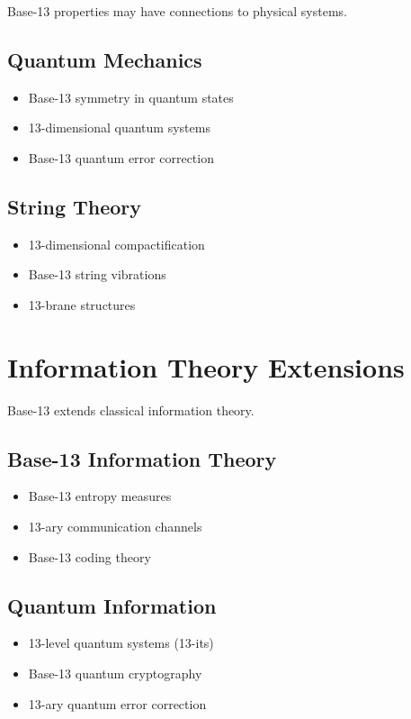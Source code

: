 \documentclass[12pt,a4paper]{report}
\begin{document}
Base-13 properties may have connections to physical systems.

\subsection{Quantum Mechanics}

\begin{itemize}
\item Base-13 symmetry in quantum states
\item 13-dimensional quantum systems
\item Base-13 quantum error correction
\end{itemize}

\subsection{String Theory}

\begin{itemize}
\item 13-dimensional compactification
\item Base-13 string vibrations
\item 13-brane structures
\end{itemize}

\section{Information Theory Extensions}

Base-13 extends classical information theory.

\subsection{Base-13 Information Theory}

\begin{itemize}
\item Base-13 entropy measures
\item 13-ary communication channels
\item Base-13 coding theory
\end{itemize}

\subsection{Quantum Information}

\begin{itemize}
\item 13-level quantum systems (13-its)
\item Base-13 quantum cryptography
\item 13-ary quantum error correction
\end{itemize}
\end{document}
